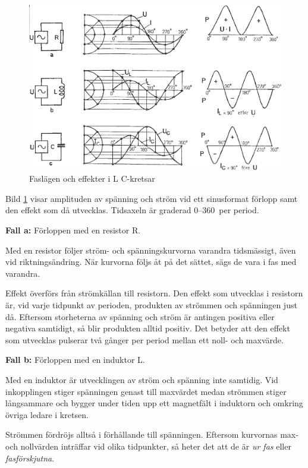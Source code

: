 \begin{figure}
\includegraphics[width=\textwidth]{images/cropped_pdfs/bild_2_3-11.pdf}
\caption{Faslägen och effekter i L C-kretsar}
\label{fig:BildII3-11}
\end{figure}

Bild \ref{fig:BildII3-11} visar amplituden av spänning och ström vid ett
sinusformat förlopp samt den effekt som då utvecklas.
Tidsaxeln är graderad 0--360\degree~per period.

\textbf{Fall a:} Förloppen med en resistor R.

Med en resistor följer ström- och spänningskurvorna varandra tidsmässigt, även
vid riktningsändring.
När kurvorna följs åt på det sättet, sägs de vara i fas med varandra.

Effekt överförs från strömkällan till resistorn.
Den effekt som utvecklas i resistorn är, vid varje tidpunkt av perioden,
produkten av strömmen och spänningen just då.
Eftersom storheterna av spänning och ström är antingen positiva eller negativa
samtidigt, så blir produkten alltid positiv.
Det betyder att den effekt som utvecklas pulserar två gånger per period mellan
ett noll- och maxvärde.

\textbf{Fall b:} Förloppen med en induktor L.

Med en induktor är utvecklingen av ström och spänning inte samtidig.
Vid inkopplingen stiger spänningen genast till maxvärdet medan strömmen stiger
långsammare och bygger under tiden upp ett magnetfält i induktorn och omkring
övriga ledare i kretsen.

Strömmen fördröjs alltså i förhållande till spänningen.
Eftersom kurvornas max- och nollvärden inträffar vid olika tidpunkter, så heter
det att de är \emph{ur fas} eller \emph{fasförskjutna}.

